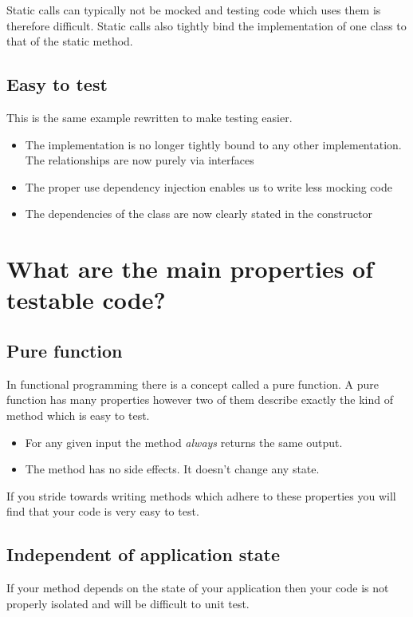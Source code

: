 \documentclass[12pt]{article}
\begin{document}
Static calls can typically not be mocked and testing code which uses them is therefore difficult. Static calls also tightly bind the implementation of one class to that of the static method.

\subsection{Easy to test}
This is the same example rewritten to make testing easier.

\begin{itemize}
	\item The implementation is no longer tightly bound to any other implementation. The relationships are now purely via interfaces
	\item The proper use dependency injection enables us to write less mocking code
	\item The dependencies of the class are now clearly stated in the constructor
\end{itemize}

\section{What are the main properties of testable code?}
\subsection{Pure function}
In functional programming there is a concept called a pure function. A pure function has many properties however two of them describe exactly the kind of method which is easy to test.
\begin{itemize}
	\item For any given input the method \emph{always} returns the same output.
	\item The method has no side effects. It doesn't change any state.
\end {itemize}

If you stride towards writing methods which adhere to these properties you will find that your code is very easy to test.

\subsection{Independent of application state}
If your method depends on the state of your application then your code is not properly isolated and will be difficult to unit test.
\end{document}
